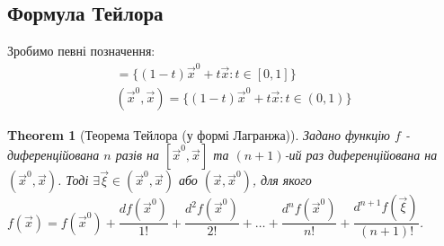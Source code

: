 \documentclass[a4paper, 10pt]{article}
\theoremstyle{theoremdd}
\newtheorem{theorem}{Theorem}[subsection]
\theoremstyle{theoremdd}
\theoremstyle{theoremdd}
\theoremstyle{theoremdd}
\theoremstyle{theoremdd}
\theoremstyle{theoremdd}
\theoremstyle{theoremdd}
\theoremstyle{theoremdd}
\theoremstyle{theoremdd}
\begin{document}
\subsection{Формула Тейлора}
Зробимо певні позначення:
\begin{align*}
[\vec{x}^0, \vec{x}] = \{(1-t)\vec{x}^0 + t \vec{x} : t \in [0,1]\} \\
(\vec{x}^0, \vec{x}) = \{(1-t)\vec{x}^0 + t \vec{x} : t \in (0,1)\}
\end{align*}

\begin{theorem}[Теорема Тейлора (у формі Лагранжа)]
Задано функцію $f$ - диференційована $n$ разів на $[\vec{x}^0,\vec{x}]$ та $(n+1)$-ий раз диференційована на $(\vec{x}^0,\vec{x})$. Тоді $\exists \vec{\xi} \in (\vec{x}^0,\vec{x})$ або $(\vec{x},\vec{x}^0)$, для якого\\
$f(\vec{x}) = f(\vec{x}^0) + \dfrac{df(\vec{x}^0)}{1!} + \dfrac{d^2 f(\vec{x}^0)}{2!} + \dots  + \dfrac{d^{n} f(\vec{x}^0)}{n!} + \dfrac{d^{n+1} f(\vec{\xi})}{(n+1)!}$.
\end{theorem}
\end{document}
